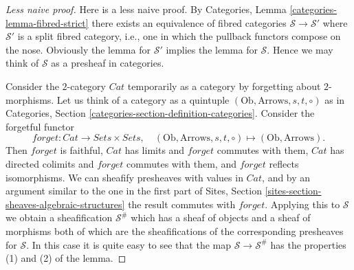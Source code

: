 \documentclass{stacks-project}
\theoremstyle{plain}
\theoremstyle{definition}
\theoremstyle{remark}
\numberwithin{equation}{subsection}
\begin{document}
\begin{proof}[Less naive proof]
Here is a less naive proof.
By Categories, Lemma \ref{categories-lemma-fibred-strict}
there exists an equivalence of
fibred categories $\mathcal{S} \to \mathcal{S}'$ where $\mathcal{S}'$
is a split fibred category, i.e., one in which the pullback
functors compose on the nose. Obviously the lemma for $\mathcal{S}'$
implies the lemma for $\mathcal{S}$. Hence we may think of $\mathcal{S}$
as a presheaf in categories.

\medskip\noindent
Consider the $2$-category $\textit{Cat}$ temporarily as a
category by forgetting about $2$-morphisms.
Let us think of a category as a quintuple
$(\text{Ob}, \text{Arrows}, s, t, \circ)$ as in
Categories, Section \ref{categories-section-definition-categories}.
Consider the forgetful functor
$$
forget : \textit{Cat} \to \textit{Sets} \times \textit{Sets}, \quad
(\text{Ob}, \text{Arrows}, s, t, \circ)
\mapsto
(\text{Ob}, \text{Arrows}).
$$
Then $forget$ is faithful, $\textit{Cat}$ has limits and
$forget$ commutes with them, $\textit{Cat}$ has directed colimits and
$forget$ commutes with them, and $forget$ reflects isomorphisms.
We can sheafify presheaves with values in $\textit{Cat}$, and
by an argument similar to the one in the first part of
Sites, Section \ref{sites-section-sheaves-algebraic-structures}
the result commutes with $forget$. Applying this to
$\mathcal{S}$ we obtain a sheafification $\mathcal{S}^\#$
which has a sheaf of objects and a sheaf of morphisms
both of which are the sheafifications of the corresponding
presheaves for $\mathcal{S}$. In this case it is quite
easy to see that the map $\mathcal{S} \to \mathcal{S}^\#$
has the properties (1) and (2) of the lemma.


\end{proof}
\end{document}
